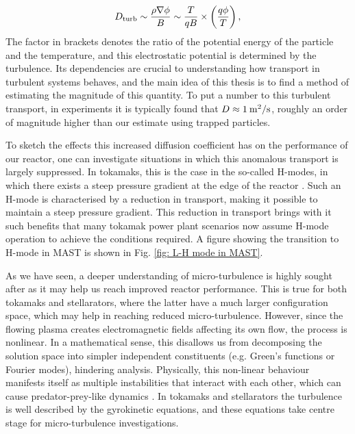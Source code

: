 \begin{equation}
    D_{\rm turb} \sim \frac{\rho \nabla \phi}{B} \sim \frac{T}{qB} \times \left( \frac{q\phi}{T} \right),
\end{equation}
The factor in brackets denotes the ratio of the potential energy of the particle and the temperature, and this electrostatic potential is determined by the turbulence. Its dependencies are crucial to understanding how transport in turbulent systems behaves, and the main idea of this thesis is to find a method of estimating the magnitude of this quantity. To put a number to this turbulent transport, in experiments it is typically found that $D \approx 1 \: {\rm m^2/s}$, roughly an order of magnitude higher than our estimate using trapped particles.
\par 

To sketch the effects this increased diffusion coefficient has on the performance of our reactor, one can investigate situations in which this anomalous transport is largely suppressed. In tokamaks, this is the case in the so-called H-modes, in which there exists a steep pressure gradient at the edge of the reactor \cite{itoh1988model,burrell1992physics,groebner1993emerging,burrell2005advances}. Such an H-mode is characterised by a reduction in transport, making it possible to maintain a steep pressure gradient. This reduction in transport brings with it such benefits that many tokamak power plant scenarios now assume H-mode operation to achieve the conditions required. A figure showing the transition to H-mode in MAST is shown in Fig. \ref{fig: L-H mode in MAST}. \par 

As we have seen, a deeper understanding of micro-turbulence is highly sought after as it may help us reach improved reactor performance. This is true for both tokamaks and stellarators, where the latter have a much larger configuration space, which may help in reaching reduced micro-turbulence. However, since the flowing plasma creates electromagnetic fields affecting its own flow, the process is nonlinear. In a mathematical sense, this disallows us from decomposing the solution space into simpler independent constituents (e.g. Green's functions or Fourier modes), hindering analysis. Physically, this non-linear behaviour manifests itself as multiple instabilities that interact with each other, which can cause predator-prey-like dynamics \cite{morel2013characterization}. In tokamaks and stellarators the turbulence is well described by the gyrokinetic equations, and these equations take centre stage for micro-turbulence investigations.

